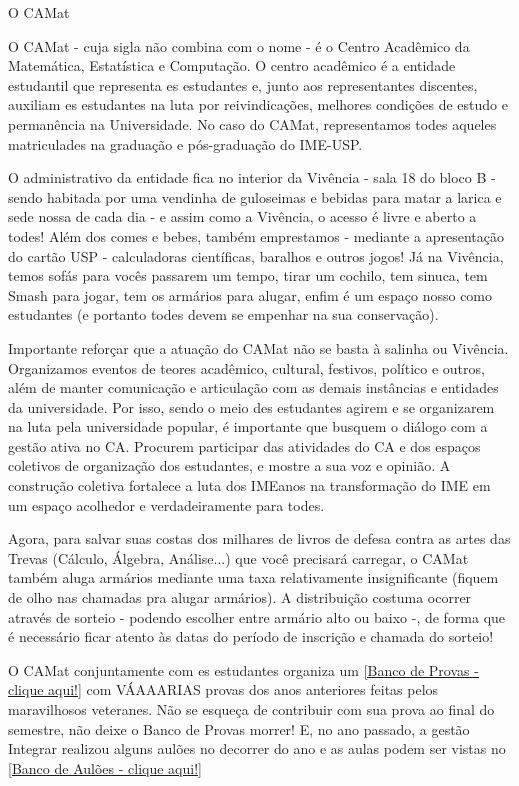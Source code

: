 \begin{secao}{O CAMat}

O CAMat - cuja sigla não combina com o nome - é o Centro Acadêmico da
Matemática, Estatística e Computação. O centro acadêmico é a entidade
estudantil que representa es estudantes e, junto aos representantes discentes, 
auxiliam es estudantes na luta por reivindicações, melhores condições de estudo 
e permanência na Universidade. No caso do CAMat, representamos todes aqueles 
matriculades na graduação e pós-graduação do IME-USP.

O administrativo da entidade fica no interior da Vivência -  sala 18 do bloco B - sendo habitada
por uma vendinha de guloseimas e bebidas para matar a larica e sede nossa de
cada dia - e assim como a Vivência, o acesso é livre e aberto a todes! Além dos
comes e bebes, também emprestamos - mediante a apresentação do cartão USP -
calculadoras científicas, baralhos e outros jogos! Já na Vivência, temos sofás
para vocês passarem um tempo, tirar um cochilo, tem sinuca, tem Smash para jogar,
tem os armários para alugar, enfim é um espaço nosso como estudantes (e portanto 
todes devem se empenhar na sua conservação).

Importante reforçar que a atuação do CAMat não se basta à salinha ou Vivência.
Organizamos eventos de teores acadêmico, cultural, festivos, político e outros, além de manter comunicação 
e articulação com as demais instâncias e entidades da universidade. Por isso, sendo o meio des 
estudantes agirem e se organizarem na luta pela universidade popular, é importante que busquem 
o diálogo com a gestão ativa no CA. Procurem participar das atividades do CA e dos espaços coletivos 
de organização dos estudantes, e mostre a sua voz e opinião. A construção coletiva fortalece a luta 
dos IMEanos na transformação do IME em um espaço acolhedor e verdadeiramente para todes.

Agora, para salvar suas costas dos milhares de livros de defesa contra as artes
das Trevas (Cálculo, Álgebra, Análise...) que você precisará carregar, o CAMat 
também aluga armários mediante uma taxa relativamente insignificante (fiquem de olho 
nas chamadas pra alugar armários). A distribuição costuma ocorrer através de sorteio - 
podendo escolher entre armário alto ou baixo -, de forma que é necessário ficar atento 
às datas do período de inscrição e chamada do sorteio!

O CAMat conjuntamente com es estudantes organiza um
\href{https://drive.google.com/drive/folders/0B0qfe1Tj7RTPUGJpSHdUaUo5LXM?usp=sharing}{[Banco de Provas - clique aqui!]}
com VÁAAARIAS provas dos anos anteriores feitas pelos maravilhosos veteranes.
Não se esqueça de contribuir com sua prova ao final do semestre, não
deixe o Banco de Provas morrer! E, no ano passado, a gestão Integrar realizou alguns aulões no decorrer %
do ano e as aulas podem ser vistas no \href{https://drive.google.com/drive/folders/1hRHKAu6G32rRKMch-nzSWzSYIRYrJz2R?usp=sharing}{[Banco de Aulões - clique aqui!]}


\end{secao}
